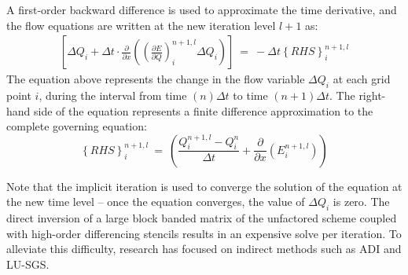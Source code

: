 \documentclass[conf]{new-aiaa}
\begin{document}
A first-order backward difference is used to approximate the time derivative, and the flow equations are written at the new iteration level $l+1$ as:
\begin{equation}
	\begin{split}
		\label{eq:NS_DeltaForm}
  			\left[\Delta{Q}_i+\Delta{t}\cdot\frac{\partial}{\partial{x}}\left(\left(\frac{\partial{E}}{\partial{Q}} \right)_i^{n+1,l}\Delta{Q}_i \right)\right]~=~-\Delta{t}\left\{RHS\right\}_i^{n+1, l}
	\end{split}
\end{equation}
The equation above represents the change in the flow variable $\Delta{Q_i}$ at each grid point $i$, during the interval from time $(n)\Delta{t}$ to time $(n+1)\Delta{t}$. The right-hand side of the equation represents a finite difference approximation to the complete governing equation:
\begin{equation*}
	\left\{RHS\right\}_i^{n+1, l}~=~\left(\frac{Q_i^{n+1, l}-Q_i^n}{\Delta{t}}+\frac{\partial}{\partial{x}}\left(E_i^{n+1, l} \right)\right)
\end{equation*}



Note that the implicit iteration is used to converge the solution of the equation at the new time level – once the equation converges, the value of $\Delta{Q}_i$ is zero. 
The direct inversion of a large block banded matrix of the unfactored scheme coupled with high-order differencing stencils results in an expensive solve per iteration. 
To alleviate this difficulty, research has focused on indirect methods such as ADI and LU-SGS. 
\end{document}
